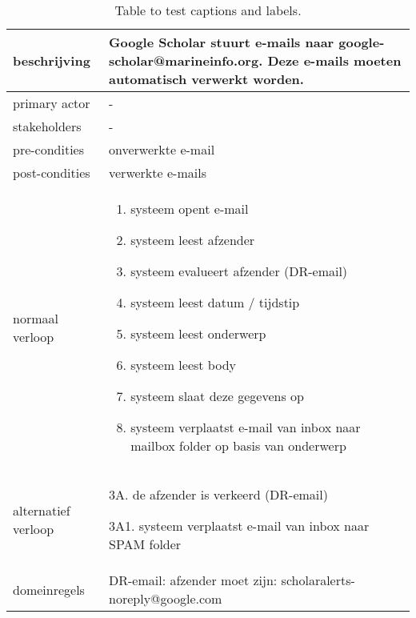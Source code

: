 \begin{table}[ptb]
    \centering
    \begin{tabular}{ | m{5cm} | m{10cm}| } 
        \hline
        \rowcolor{lightgray}
        beschrijving & Google Scholar stuurt e-mails naar google-scholar@marineinfo.org. Deze e-mails moeten automatisch verwerkt worden. \\ 
        \hline
        primary actor & - \\ 
        \hline
        stakeholders & - \\ 
        \hline
        pre-condities & onverwerkte e-mail \\ 
        \hline
        post-condities & verwerkte e-mails \\ 
        \hline
        normaal verloop & 
        \begin{enumerate}
            \item systeem opent e-mail
            \item systeem leest afzender
            \item systeem evalueert afzender (DR-email)
            \item systeem leest datum / tijdstip
            \item systeem leest onderwerp
            \item systeem leest body
            \item systeem slaat deze gegevens op
            \item systeem verplaatst e-mail van inbox naar mailbox folder op basis van onderwerp
        \end{enumerate} \\ 
        \hline
        alternatief verloop & 
        \begin{description}
            \item 3A. de afzender is verkeerd (DR-email)
            \item 3A1. systeem verplaatst e-mail van inbox naar SPAM folder
        \end{description} \\ 
        \hline
        domeinregels & DR-email: afzender moet zijn: scholaralerts-noreply@google.com \\ 
        \hline
    \end{tabular}
    \caption{Table to test captions and labels.}
\end{table}
\newpage
